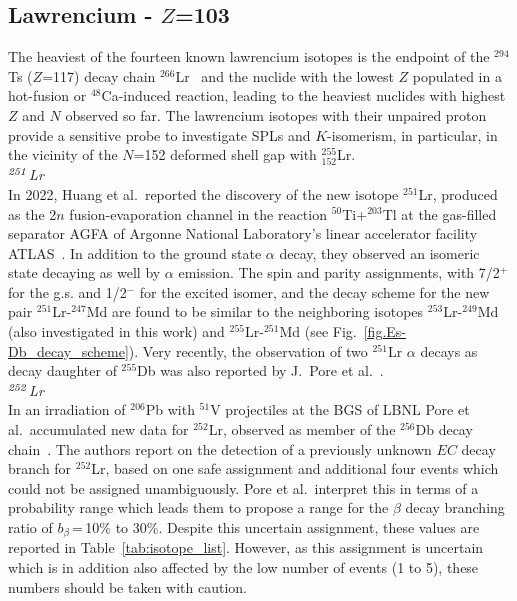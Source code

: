   
\subsection{Lawrencium - $Z$=103}\label{Lr}
The heaviest of the fourteen known lawrencium isotopes is the endpoint of the $^{294}$Ts ($Z$=117) decay chain $^{266}$Lr~\cite{Khuyagbaatar2014,Khuyagbaatar2019} and the nuclide with the lowest $Z$ populated in a hot-fusion or $^{48}$Ca-induced reaction, leading to the heaviest nuclides with highest $Z$ and $N$ observed so far. The lawrencium isotopes with their unpaired proton provide a sensitive probe to investigate SPLs and $K$-isomerism, in particular, in the vicinity of the $N$=152 deformed shell gap with $^{255}_{152}$Lr. \\

{\it $^{\it251}$Lr}\\
In 2022, Huang et al.~reported the discovery of the new isotope $^{251}$Lr, produced as the 2$n$ fusion-evaporation channel in the reaction $^{50}$Ti+$^{203}$Tl at the gas-filled separator AGFA of Argonne National Laboratory's linear accelerator facility ATLAS~\cite{Huang2022}. 
In addition to the ground state $\alpha$ decay, they observed an isomeric state decaying as well by $\alpha$ emission. The spin and parity assignments, with 7/2$^+$ for the g.s. and 1/2$^-$ for the excited isomer, and the decay scheme for the new pair $^{251}$Lr-$^{247}$Md are found to be similar to the neighboring isotopes $^{253}$Lr-$^{249}$Md (also investigated in this work) and $^{255}$Lr-$^{251}$Md (see Fig.~\ref{fig.Es-Db_decay_scheme}). 
Very recently, the observation of two $^{251}$Lr $\alpha$ decays as decay daughter of $^{255}$Db was also reported by J.~Pore et al.~\cite{Pore2024a}.\\

{\it $^{\it252}$Lr}\\
In an irradiation of $^{206}$Pb with $^{51}$V projectiles at the BGS of LBNL Pore et al.~accumulated new data for $^{252}$Lr, observed as member of the $^{256}$Db decay chain~\cite{Pore2024}.
The authors report on the detection of a previously unknown $EC$ decay branch for $^{252}$Lr, based on one safe assignment and additional four events which could not be assigned unambiguously. 
Pore et al.~interpret this in terms of a probability range which leads them to propose a range for the $\beta$ decay branching ratio of $b_\beta$\,=\,10\% to 30\%. 
Despite this uncertain assignment, these values are reported in Table~\ref{tab:isotope_list}. 
However, as this assignment is uncertain which is in addition also affected by the low number of events (1 to 5), these numbers should be taken with caution.\\

